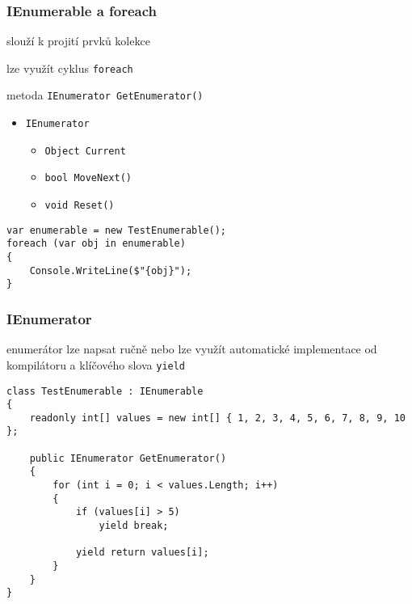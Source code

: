 \begin{frame}[fragile]
\frametitle{IEnumerable a foreach}
\vfill
\begin{bitemize}{}
\item slouží k projití prvků kolekce
\item lze využít cyklus \lstinline|foreach|
\item metoda \lstinline|IEnumerator GetEnumerator()|
\begin{itemize}
\item \lstinline|IEnumerator|
\begin{itemize}
\item \lstinline|Object Current|
\item \lstinline|bool MoveNext()|
\item \lstinline|void Reset()|
\end{itemize}
\end{itemize}
\end{bitemize}
\vfill
\begin{yesblock}
\begin{lstlisting}
var enumerable = new TestEnumerable();
foreach (var obj in enumerable)
{
    Console.WriteLine($"{obj}");
}
\end{lstlisting}
\end{yesblock}
\vfill
\end{frame}




\begin{frame}[fragile]
\frametitle{IEnumerator}
\vfill
\begin{bitemize}{}
\item enumerátor lze napsat ručně nebo lze využít automatické implementace od kompilátoru a klíčového slova \lstinline|yield|
\end{bitemize}
\vfill
\begin{yesblock}
\begin{lstlisting}
class TestEnumerable : IEnumerable
{
    readonly int[] values = new int[] { 1, 2, 3, 4, 5, 6, 7, 8, 9, 10 };

    public IEnumerator GetEnumerator()
    {
        for (int i = 0; i < values.Length; i++)
        {
            if (values[i] > 5)
                yield break;

            yield return values[i];
        }
    }
}
\end{lstlisting}
\end{yesblock}
\vfill
\end{frame}


